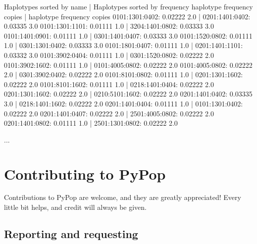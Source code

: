 \documentclass[letterpaper,10pt,english,openany,oneside]{sphinxmanual}
\begin{document}
\begin{sphinxVerbatim}[commandchars=\\\{\}]
Haplotypes sorted by name             | Haplotypes sorted by frequency
haplotype         frequency \PYGZsh{} copies  | haplotype         frequency \PYGZsh{} copies
0101:1301:0402:   0.02222   2.0       | 0201:1401:0402:   0.03335   3.0
0101:1301:1101:   0.01111   1.0       | 3204:1401:0802:   0.03333   3.0
0101:1401:0901:   0.01111   1.0       | 0301:1401:0407:   0.03333   3.0
0101:1520:0802:   0.01111   1.0       | 0301:1301:0402:   0.03333   3.0
0101:1801:0407:   0.01111   1.0       | 0201:1401:1101:   0.03332   3.0
0101:3902:0404:   0.01111   1.0       | 0301:1520:0802:   0.02222   2.0
0101:3902:1602:   0.01111   1.0       | 0101:4005:0802:   0.02222   2.0
0101:4005:0802:   0.02222   2.0       | 0301:3902:0402:   0.02222   2.0
0101:8101:0802:   0.01111   1.0       | 0201:1301:1602:   0.02222   2.0
0101:8101:1602:   0.01111   1.0       | 0218:1401:0404:   0.02222   2.0
0201:1301:1602:   0.02222   2.0       | 0210:5101:1602:   0.02222   2.0
0201:1401:0402:   0.03335   3.0       | 0218:1401:1602:   0.02222   2.0
0201:1401:0404:   0.01111   1.0       | 0101:1301:0402:   0.02222   2.0
0201:1401:0407:   0.02222   2.0       | 2501:4005:0802:   0.02222   2.0
0201:1401:0802:   0.01111   1.0       | 2501:1301:0802:   0.02222   2.0

...
\end{sphinxVerbatim}

\sphinxstepscope


\chapter{Contributing to PyPop}
\label{\detokenize{docs/guide-chapter-contributing:contributing-to-pypop}}\label{\detokenize{docs/guide-chapter-contributing::doc}}
\sphinxAtStartPar
Contributions to PyPop are welcome, and they are greatly appreciated!
Every little bit helps, and credit will always be given.


\section{Reporting and requesting}
\label{\detokenize{docs/guide-chapter-contributing:reporting-and-requesting}}
\end{document}

